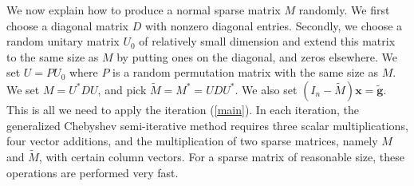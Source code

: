 \documentclass[reqno]{amsart}
\newcommand{\mb}{\mathbf}
\numberwithin{equation}{section}
\theoremstyle{plain}
\theoremstyle{definition}
\begin{document}
We now explain how to produce a normal sparse matrix $M$ randomly. We first choose a diagonal matrix $D$ with nonzero diagonal entries. Secondly, we choose a random unitary matrix $U_0$ of relatively small dimension and extend this matrix to the same size as $M$ by putting ones on the diagonal, and zeros elsewhere. We set $U=PU_0$ where $P$ is a random permutation matrix with the same size as $M$. We set $M=U^*DU$, and pick $\widetilde{M} = M^* = UDU^*$. We also set $(I_n-\widetilde{M})\mathbf{x}=\widetilde{\mb{g}}$. This is all we need to apply the iteration (\ref{main}). In each iteration, the generalized Chebyshev semi-iterative method requires three scalar multiplications, four vector additions, and the multiplication of two sparse matrices, namely $M$ and $\widetilde{M}$, with certain column vectors. For a sparse matrix of reasonable size, these operations are performed very fast.
	
\end{document}
